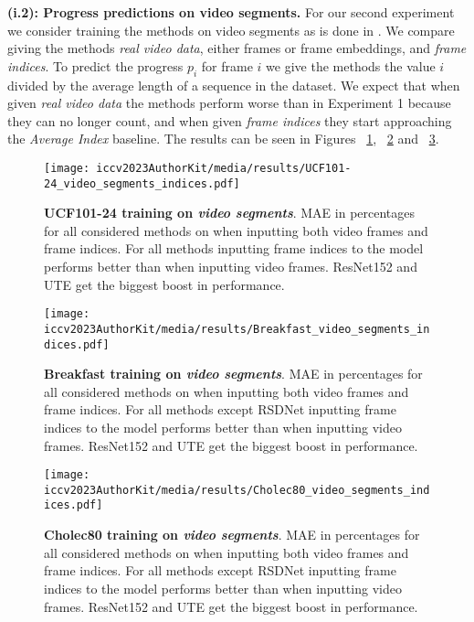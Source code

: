 \medskip\noindent\textbf{(i.2): Progress predictions on video segments.}
For our second experiment we consider training the methods on video segments as is done in \cite{becattini2017}. We compare giving the methods \textsl{real video data}, either frames or frame embeddings, and \textsl{frame indices}. To predict the progress $p_{i}$ for frame $i$ we give the methods the value $i$ divided by the average length of a sequence in the dataset. We expect that when given \textsl{real video data} the methods perform worse than in Experiment 1 because they can no longer count, and when given \textsl{frame indices} they start approaching the \textsl{Average Index} baseline. The results can be seen in Figures ~\ref{fig:result_ucf_seg}, ~\ref{fig:result_breakfast_seg} and ~\ref{fig:result_cholec_seg}.

\begin{figure}
\begin{center}
   \texttt{[image: iccv2023AuthorKit/media/results/UCF101-24\_video\_segments\_indices.pdf]}
\end{center}
   \caption{\textbf{UCF101-24 training on \textsl{video segments}}. MAE in percentages for all considered methods on when inputting both video frames and frame indices. For all methods inputting frame indices to the model performs better than when inputting video frames. ResNet152 and UTE get the biggest boost in performance.}
\label{fig:result_ucf_seg}
\end{figure}
\begin{figure}
\begin{center}
   \texttt{[image: iccv2023AuthorKit/media/results/Breakfast\_video\_segments\_indices.pdf]}
\end{center}
   \caption{\textbf{Breakfast training on \textsl{video segments}}. MAE in percentages for all considered methods on when inputting both video frames and frame indices. For all methods except RSDNet inputting frame indices to the model performs better than when inputting video frames. ResNet152 and UTE get the biggest boost in performance.}
\label{fig:result_breakfast_seg}
\end{figure}
\begin{figure}
\begin{center}
   \texttt{[image: iccv2023AuthorKit/media/results/Cholec80\_video\_segments\_indices.pdf]}
\end{center}
   \caption{\textbf{Cholec80 training on \textsl{video segments}}. MAE in percentages for all considered methods on when inputting both video frames and frame indices. For all methods except RSDNet inputting frame indices to the model performs better than when inputting video frames. ResNet152 and UTE get the biggest boost in performance.}
\label{fig:result_cholec_seg}
\end{figure}

